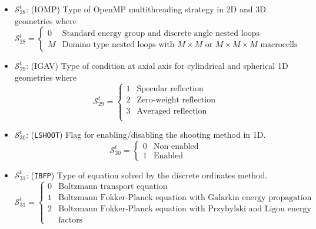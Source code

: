 \begin{itemize}
\item $\mathcal{S}^{t}_{28}$: (IOMP) Type of OpenMP multithreading strategy in 2D and 3D geometries where
\begin{displaymath}
\mathcal{S}^{t}_{28} = \left\{
\begin{array}{rl}
 0 & \textrm{Standard energy group and discrete angle nested loops}\\
 M & \textrm{Domino type nested loops with $M\times M$ or $M \times M \times M$ macrocells}
\end{array} \right.
\end{displaymath}

\item $\mathcal{S}^{t}_{29}$: (IGAV) Type of condition at axial axis for cylindrical and spherical 1D geometries where
\begin{displaymath}
\mathcal{S}^{t}_{29} = \left\{
\begin{array}{rl}
 1 & \textrm{Specular reflection}\\
 2 & \textrm{Zero-weight reflection}\\
 3 & \textrm{Averaged reflection}\\
\end{array} \right.
\end{displaymath}

\item $\mathcal{S}^{t}_{30}$: ({\tt LSHOOT}) Flag for enabling/disabling the shooting method in 1D.
\begin{displaymath}
\mathcal{S}^{t}_{30} = \left\{
\begin{array}{rl}
 0 & \textrm{Non enabled} \\
 1 & \textrm{Enabled}
\end{array} \right.
\end{displaymath}

\item $\mathcal{S}^{t}_{31}$: ({\tt IBFP}) Type of equation solved by the discrete ordinates method.
\begin{displaymath}
\mathcal{S}^{t}_{31} = \left\{
\begin{array}{rl}
 0 & \textrm{Boltzmann transport equation} \\
 1 & \textrm{Boltzmann Fokker-Planck equation with Galarkin energy propagation factors} \\
 2 & \textrm{Boltzmann Fokker-Planck equation with Przybylski and Ligou energy propagation} \\
  & \textrm{factors}
\end{array} \right.
\end{displaymath}
\end{itemize}

